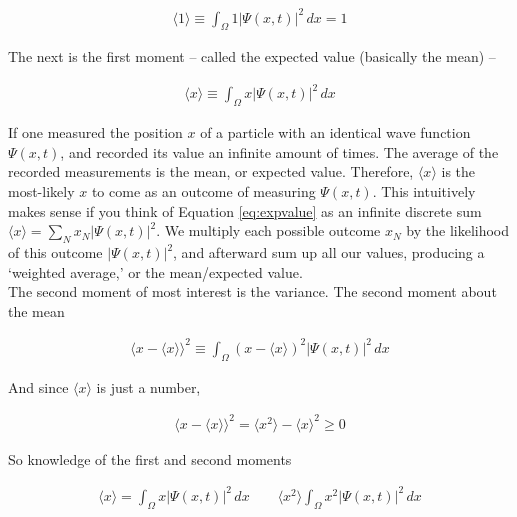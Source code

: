 \begin{align*} \label{}
  \langle 1 \rangle \equiv \int_\Omega 1|\Psi(x, t)|^2 \, dx = 1      
\end{align*}\vspace{3px}

The next is the first moment -- called the expected value (basically the mean)
-- 

\begin{align} \label{eq:expvalue}
  \langle x \rangle \equiv \int_\Omega x |\Psi(x, t)|^2 \, dx
\end{align}  

If one measured the position $x$ of a particle with an identical wave function
$\Psi(x, t)$, and recorded its value an infinite amount of times. The average
of the recorded measurements is the mean, or expected value. Therefore,
$\langle x \rangle $ is the most-likely $x$ to come as an outcome of measuring
$\Psi(x, t)$. This intuitively makes sense if you think of Equation \ref{eq:expvalue} as
an infinite discrete sum $\langle x \rangle = \sum_N x_N |\Psi(x, t)|^2$. We
multiply each possible outcome $x_N$ by the likelihood of this outcome
$|\Psi(x, t)|^2$, and afterward sum up all our values, producing a `weighted
average,' or the mean/expected value. \\

The second moment of most interest is the variance. The second moment about the
mean 

\begin{align*} \label{}
  \langle x - \langle x \rangle  \rangle ^2 \equiv \int_\Omega (x - \langle
  x \rangle )^2 |\Psi(x, t)|^2 \, dx
\end{align*}\vspace{3px}

And since $\langle x \rangle $ is just a number, 

\begin{align*}
  \langle x - \langle x \rangle  \rangle ^2 = \langle x^2 \rangle - \langle
  x \rangle ^2 \geq 0
\end{align*}\vspace{3px}

So knowledge of the first and second moments 

\begin{align*}
  \langle x \rangle = \int_\Omega x|\Psi(x, t)|^2 \, dx \qquad \langle x^2
  \rangle \int_\Omega x^2 |\Psi(x, t)|^2 \, dx
\end{align*}\vspace{3px}

